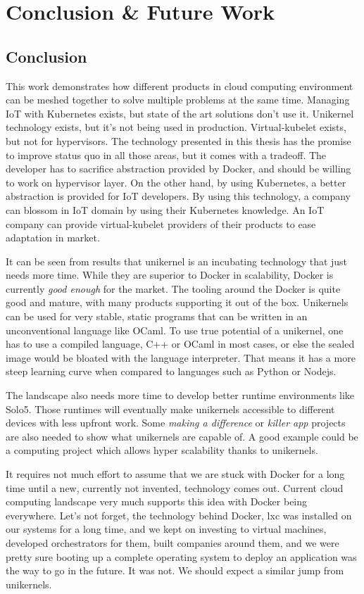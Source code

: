 \chapter{Conclusion \& Future Work}\label{chapter:conclusion}
\section{Conclusion}
This work demonstrates how different products in cloud computing environment can be meshed together to solve multiple problems at the same time. Managing IoT with Kubernetes exists, but state of the art solutions don't use it. Unikernel technology exists, but it's not being used in production. Virtual-kubelet exists, but not for hypervisors. The technology presented in this thesis has the promise to improve status quo in all those areas, but it comes with a tradeoff. The developer has to sacrifice abstraction provided by Docker, and should be willing to work on hypervisor layer. On the other hand, by using Kubernetes, a better abstraction is provided for IoT developers. By using this technology, a company can blossom in IoT domain by using their Kubernetes knowledge. An IoT company can provide virtual-kubelet providers of their products to ease adaptation in market.

It can be seen from results that unikernel is an incubating technology that just needs more time. While they are superior to Docker in scalability, Docker is currently \textit{good enough} for the market. The tooling around the Docker is quite good and mature, with many products supporting it out of the box. Unikernels can be used for very stable, static programs that can be written in an unconventional language like OCaml. To use true potential of a unikernel, one has to use a compiled language, C++ or OCaml in most cases, or else the sealed image would be bloated with the language interpreter. That means it has a more steep learning curve when compared to languages such as Python or Nodejs.

The landscape also needs more time to develop better runtime environments like Solo5. Those runtimes will eventually make unikernels accessible to different devices with less upfront work. Some \textit{making a difference} or \textit{killer app} projects are also needed to show what unikernels are capable of. A good example could be a computing project which allows hyper scalability thanks to unikernels.

It requires not much effort to assume that we are stuck with Docker for a long time until a new, currently not invented, technology comes out. Current cloud computing landscape very much supports this idea with Docker being everywhere. Let's not forget, the technology behind Docker, lxc was installed on our systems for a long time, and we kept on investing to virtual machines, developed orchestrators for them, built companies around them, and we were pretty sure booting up a complete operating system to deploy an application was the way to go in the future. It was not. We should expect a similar jump from unikernels.


